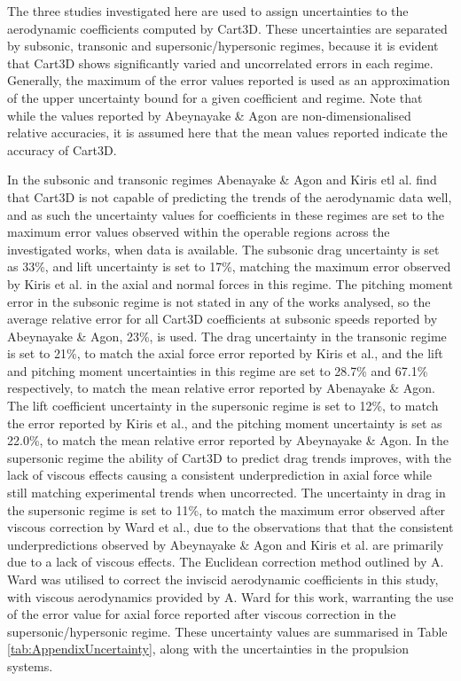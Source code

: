 The three studies investigated here are used to assign uncertainties to the aerodynamic coefficients computed by Cart3D. These uncertainties are separated by subsonic, transonic and supersonic/hypersonic regimes, because it is evident that Cart3D shows significantly varied and uncorrelated errors in each regime. Generally, the maximum of the error values reported is used as an approximation of the upper uncertainty bound for a given coefficient and regime. 
  Note that while the values reported by Abeynayake \& Agon\cite{Abeynayake2013a} are non-dimensionalised relative accuracies, it is assumed here that the mean values reported indicate the accuracy of Cart3D. 
  
  In the subsonic and transonic regimes Abenayake \& Agon and Kiris etl al. find that Cart3D is not capable of predicting the trends of the aerodynamic data well\cite{Abeynayake2013a,Kiris2011}, and as such the uncertainty values for coefficients in these regimes are set to the maximum error values observed within the operable regions across the investigated works, when data is available.
  The subsonic drag uncertainty is set as 33\%, and lift uncertainty is set to 17\%, matching the  maximum error observed by Kiris et al.\cite{Kiris2011} in the axial and normal forces in this regime. 
The pitching moment error in the subsonic regime is not stated in any of the works analysed, so the average relative error for all Cart3D coefficients at subsonic speeds reported by Abeynayake \& Agon\cite{Abeynayake2013a}, 23\%, is used.
The drag uncertainty in the transonic regime is set to 21\%, to match the axial force error reported by Kiris et al.\cite{Kiris2011}, and the lift and pitching moment uncertainties in this regime are set to 28.7\% and 67.1\% respectively, to match the mean relative error reported by Abenayake \& Agon\cite{Abeynayake2013a}. 
The lift coefficient uncertainty in the supersonic regime is set to 12\%, to match the error reported by Kiris et al.\cite{Kiris2011}, and the pitching moment uncertainty is set as 22.0\%, to match the mean relative error reported by Abeynayake \& Agon\cite{Abeynayake2013a}. 
In the supersonic regime the ability of Cart3D to predict drag trends improves, with the lack of viscous effects causing a consistent underprediction in axial force while still matching experimental trends when uncorrected\cite{Abeynayake2013a,Ward2018,Kiris2011}. The uncertainty in drag in the supersonic regime is set to 11\%, to match the maximum error observed after viscous correction by Ward et al.\cite{Ward2018}, due to the observations that that the consistent underpredictions observed by Abeynayake \& Agon\cite{Abeynayake2013a} and Kiris et al.\cite{Kiris2011} are primarily due to a lack of viscous effects. The Euclidean correction method outlined by A. Ward was utilised to correct the inviscid aerodynamic coefficients in this study, with viscous aerodynamics provided by A. Ward for this work, warranting the use of the error value for axial force reported after viscous correction in the supersonic/hypersonic regime. 
These uncertainty values are summarised in Table \ref{tab:AppendixUncertainty}, along with the uncertainties in the propulsion systems. 




